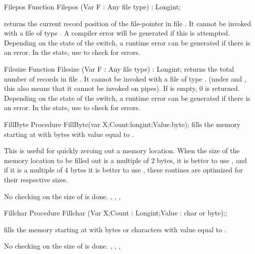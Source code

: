 
\begin{function}{Filepos}
\Declaration
Function Filepos (Var F : Any file type) : Longint;

\Description
{} returns the current record position of the file-pointer in file
. It cannot be invoked with a file of type . A compiler error
will be generated if this is attempted.
\Errors
Depending on the state of the  switch, a runtime error can be 
generated if there is an error. In the  state, use 
to check for errors.
\SeeAlso
{}
\end{function}


\begin{function}{Filesize}
\Declaration
Function Filesize (Var F : Any file type) : Longint;
\Description
{} returns the total number of records in file .
It cannot be invoked with a file of type . (under \linux and \unix, this
also means that it cannot be invoked on pipes).
If  is empty, 0 is returned.
\Errors
Depending on the state of the  switch, a runtime error can be 
generated if there is an error. In the  state, use 
to check for errors.
\SeeAlso
{}
\end{function}


\begin{procedure}{FillByte}
\Declaration
Procedure FillByte(var X;Count:longint;Value:byte);
\Description
{} fills the memory starting at  with  bytes
with value equal to .

This is useful for quickly zeroing out a memory location. When the size of
the memory location to be filled out is a multiple of 2 bytes, it is better
 to use , and if it is a multiple of 4 bytes it is better
to use , these routines are optimized for their respective sizes.

\Errors
No checking on the size of  is done.
\SeeAlso
{}, , , 
\end{procedure}


\begin{procedure}{Fillchar}
\Declaration
Procedure Fillchar (Var X;Count : Longint;Value : char or byte);;

\Description
{} fills the memory starting at  with  bytes
or characters with value equal to .

\Errors
No checking on the size of  is done.
\SeeAlso
{}, , , 
\end{procedure}

